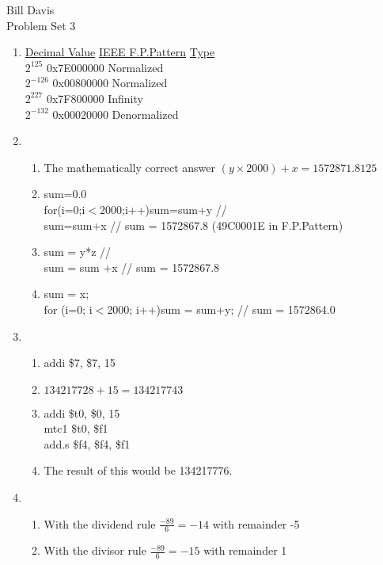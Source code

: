 \documentclass[11pt,fleqn]{article}
\begin{document}
\newcommand{\mbf}[1]{\mbox{{\bfseries #1}}}
\newcommand{\N}{\mbf{N}}
\renewcommand{\O}{\mbf{O}}

\noindent Bill Davis \\
 Problem Set 3

\begin{enumerate}
\item 
  \begin{tabbing}
  \underline{Decimal Value}  \=\underline{IEEE F.P.Pattern}  \=\underline{Type} \\
   $2^{125}$  \> 0x7E000000 \> Normalized  \\
 	$2^{-126}$ \> 0x00800000 \> Normalized  \\
	$2^{227}$  \> 0x7F800000 \> Infinity    \\
   $2^{-132}$ \> 0x00020000 \> Denormalized \\
  \end{tabbing}

\item 
  \begin{enumerate}
  \item The mathematically correct answer $(y \times 2000) + x = 1572871.8125$
  \item 
		sum=0.0\\
		for(i=0;i$<$2000;i++)sum=sum+y // \\
		sum=sum+x // sum = 1572867.8 (49C0001E in F.P.Pattern)\\
     
  \item 
		sum = y*z // \\
		sum = sum +x // sum = 1572867.8 \\

  \item
		sum = x; \\
		for (i=0; i$<$2000; i++)sum = sum+y; // sum = 1572864.0
  
  \end{enumerate}
\item 
	\begin{enumerate}
	\item addi \$7, \$7, 15
	\item $134217728 + 15 = 134217743$
	\item addi \$t0, \$0, 15\\
         mtc1 \$t0, \$f1 \\
         add.s \$f4, \$f4, \$f1 \\
	\item 
			The result of this would be 134217776. 
					
	\end{enumerate}
\item 
	\begin{enumerate}
	\item With the dividend rule $\frac{-89}{6} = -14$ with remainder -5
	\item With the divisor rule $\frac{-89}{6}= -15$ with remainder 1

	
	\end{enumerate}
\end{enumerate}
\end{document}

